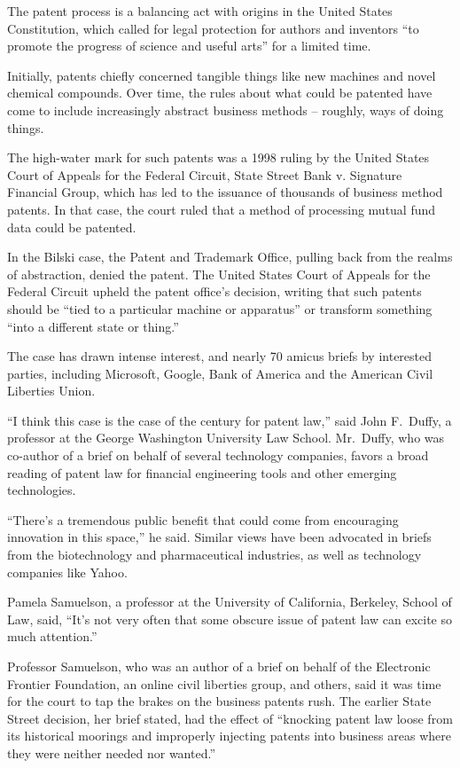 ﻿\documentclass[12pt]{article}
\begin{document}
The patent process is a balancing act with origins in the United States Constitution, which called
for legal protection for authors and inventors ``to promote the progress of science and useful
arts'' for a limited time.

Initially, patents chiefly concerned tangible things like new machines and novel chemical compounds.
Over time, the rules about what could be patented have come to include increasingly abstract
business methods -- roughly, ways of doing things.

The high-water mark for such patents was a 1998 ruling by the United States Court of Appeals for the
Federal Circuit, State Street Bank v. Signature Financial Group, which has led to the issuance of
thousands of business method patents. In that case, the court ruled that a method of processing
mutual fund data could be patented.

In the Bilski case, the Patent and Trademark Office, pulling back from the realms of abstraction,
denied the patent. The United States Court of Appeals for the Federal Circuit upheld the patent
office's decision, writing that such patents should be ``tied to a particular machine or apparatus''
or transform something ``into a different state or thing.''

The case has drawn intense interest, and nearly 70 amicus briefs by interested parties, including
Microsoft, Google, Bank of America and the American Civil Liberties Union.

``I think this case is the case of the century for patent law,'' said John F.~Duffy, a professor at
the George Washington University Law School. Mr.~Duffy, who was co-author of a brief on behalf of
several technology companies, favors a broad reading of patent law for financial engineering tools
and other emerging technologies.

``There's a tremendous public benefit that could come from encouraging innovation in this space,''
he said. Similar views have been advocated in briefs from the biotechnology and pharmaceutical
industries, as well as technology companies like Yahoo.

Pamela Samuelson, a professor at the University of California, Berkeley, School of Law, said, ``It's
not very often that some obscure issue of patent law can excite so much attention.''

Professor Samuelson, who was an author of a brief on behalf of the Electronic Frontier Foundation,
an online civil liberties group, and others, said it was time for the court to tap the brakes on the
business patents rush. The earlier State Street decision, her brief stated, had the effect of
``knocking patent law loose from its historical moorings and improperly injecting patents into
business areas where they were neither needed nor wanted.''
\end{document}
